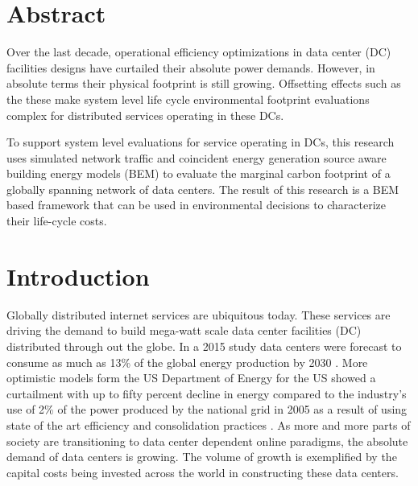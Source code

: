 \section{Abstract}	%
\addtocounter{section}{1}



Over the last decade, operational efficiency optimizations in data center (DC) facilities designs have curtailed their absolute power demands. However, in absolute terms their physical footprint is still growing. Offsetting effects such as the these make system level life cycle environmental footprint evaluations complex for distributed services operating in these DCs. 

To support system level evaluations for service operating in DCs, this research uses simulated network traffic and coincident energy generation source aware building energy models (BEM) to evaluate the marginal carbon footprint of a globally spanning network of data centers. The result of this research is a BEM based framework that can be used in environmental decisions to characterize their life-cycle costs.




\section{Introduction}
Globally distributed internet services are ubiquitous today. These services are driving the demand to build mega-watt scale data center facilities (DC) distributed through out the globe. In a 2015 study data centers were forecast to consume as much as 13\% of the global energy production by 2030 \citep{andrae15}. More optimistic models form the US Department of Energy for the US showed a curtailment with up to fifty percent decline in energy compared to the industry's use of 2\% of the power produced by the national grid in 2005 as a result of using state of the art efficiency and consolidation practices \citep{Shehabi16}. As more and more parts of society are transitioning to data center dependent online paradigms, the absolute demand of data centers is growing. The volume of growth is exemplified by the capital costs being invested across the world in constructing these data centers.

